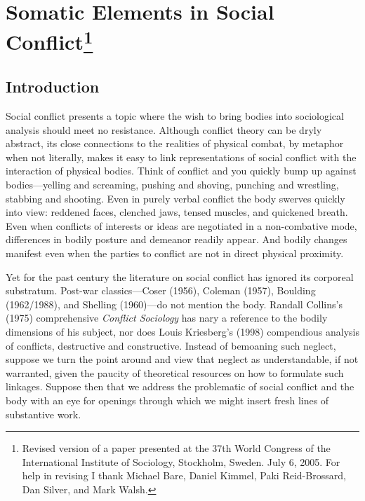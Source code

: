 \chapter[Somatic Elements in Social Conflict (2006)]{Somatic Elements in Social Conflict\footnote{Revised version of a paper presented at the 37th World Congress of the International Institute of Sociology, Stockholm, Sweden. July 6, 2005. For help in revising I thank Michael Bare, Daniel Kimmel, Paki Reid-Brossard, Dan Silver, and Mark Walsh.}}

\section*{Introduction}

Social conflict presents a topic where the wish to bring bodies into sociological analysis should meet no resistance. Although conflict theory can be dryly abstract, its close connections to the realities of physical combat, by metaphor when not literally, makes it easy to link representations of social conflict with the interaction of physical bodies. Think of conflict and you quickly bump up against bodies---yelling and screaming, pushing and shoving, punching and wrestling, stabbing and shooting. Even in purely verbal conflict the body swerves quickly into view: reddened faces, clenched jaws, tensed muscles, and quickened breath. Even when conflicts of interests or ideas are negotiated in a non-combative mode, differences in bodily posture and demeanor readily appear. And bodily changes manifest even when the parties to conflict are not in direct physical proximity.

Yet for the past century the literature on social conflict has ignored its corporeal substratum. Post-war classics---Coser (1956), Coleman (1957), Boulding (1962/1988), and Shelling (1960)---do not mention the body. Randall Collins's (1975) comprehensive \emph{Conflict Sociology} has nary a reference to the bodily dimensions of his subject, nor does Louis Kriesberg's (1998) compendious analysis of conflicts, destructive and constructive. Instead of bemoaning such neglect, suppose we turn the point around and view that neglect as understandable, if not warranted, given the paucity of theoretical resources on how to formulate such linkages. Suppose then that we address the problematic of social conflict and the body with an eye for openings through which we might insert fresh lines of substantive work.

